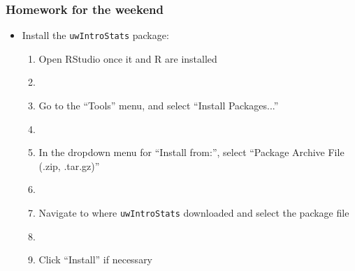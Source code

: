 \documentclass[12pt]{beamer}
\newcommand{\myframe}[1]{\begin{frame} \frametitle{#1}}
\begin{document}
\myframe{Homework for the weekend}
\begin{itemize}
\item Install the \texttt{uwIntroStats} package:
\begin{enumerate}
\item Open RStudio once it and R are installed
\item[]
\item Go to the ``Tools'' menu, and select ``Install Packages...''
\item[]
\item In the dropdown menu for ``Install from:'', select ``Package Archive File (.zip, .tar.gz)''
\item[]
\item Navigate to where \texttt{uwIntroStats} downloaded and select the package file
\item[]
\item Click ``Install'' if necessary
\end{enumerate}
\end{itemize}
\end{frame}
\end{document}
